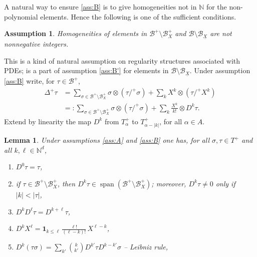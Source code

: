 \documentclass[10pt]{amsart}
\newenvironment{enumeratea}
{\bgroup\def\theenumi{\alph{enumi}}\begin{enumerate}}
{\end{enumerate}\egroup}
\DeclareMathOperator{\Span}{span}
\theoremstyle{plain}
\newtheorem{lem}[thm]{Lemma}
\newtheorem{assumption}{Assumption}
\renewcommand{\theassumption}{\Alph{assumption}}
\theoremstyle{definition}
\newcommand{\bbN}{\mathbb{N}}
\newcommand{\mcB}{\mathcal{B}}
\begin{document}
A natural way to ensure \eqref{ass:B} is to give homogeneities not in $\bbN$ for the non-polynomial elements.
Hence the following is one of the sufficient conditions.

\bgroup
\addtocounter{assumption}{-1}
\renewcommand{\theassumption}{\Alph{assumption}'}\begin{assumption}\label{ass:B'}
Homogeneities of elements in $\mcB^+\setminus\mcB_X^+$ and $\mcB\setminus\mcB_{\underline{X}}$ are not nonnegative integers.
\end{assumption}
\egroup

This is a kind of natural assumption on regularity structures associated with PDEs; \cite[Ass.\,5.3]{Hai} is a part of assumption \eqref{ass:B'} for elements in $\mcB\setminus\mcB_{\underline{X}}$. Under assumption \eqref{ass:B} write, for $\tau\in\mcB^+$,
\begin{equation}\label{def of D^ktau}
\begin{split}
\Delta^+\tau &= \sum_{\sigma\in\mcB^+\setminus\mcB_X^+}\sigma\otimes(\tau/^+\sigma) + \sum_{k}X^k\otimes(\tau/^+X^k) \\
&=: \sum_{\sigma\in\mcB^+\setminus\mcB_X^+}\sigma\otimes(\tau/^+\sigma) + \sum_{k}\frac{X^k}{k!}\otimes D^k\tau.
\end{split}
\end{equation}
Extend by linearity the map $D^k$ from $T_\alpha^+$ to $T_{\alpha-|k|}^+$, for all $\alpha\in A$.

\begin{lem}\label{lem:recursive rules}
Under assumptions \eqref{ass:A} and \eqref{ass:B} one has, for all $\sigma,\tau\in T^+$ and all $k,\ell\in\bbN^d$,
\begin{enumeratea}
	\item\label{lem:recursive rulesa} $D^0\tau = \tau$,
	
	\item\label{lem:recursive rulesb} if $\tau\!\in\!\mcB^+\!\setminus\!\mcB_X^+$, then $D^k\tau\!\in\!\Span (\mcB^+\!\setminus\!\mcB_X^+)$;
	moreover, $D^k\tau\!\neq\! 0$ only if $|k|\!<\!|\tau|$,
		
	\item\label{lem:recursive rulesc} $D^{k}D^\ell\tau = D^{k+\ell}\tau$,

	\item\label{lem:recursive rulesd} $D^{k}X^\ell = \mathbf{1}_{k\le \ell}\, \frac{\ell!}{(\ell-k)!} \, X^{\ell-k}$,
	
	\item\label{lem:recursive rulese} $D^k(\tau\sigma) = \sum_{k'} \binom{k}{k'} D^{k'}\tau D^{k-k'}\sigma$ -- {\sl Leibniz rule},
\end{enumeratea}
\end{lem}
\end{document}
